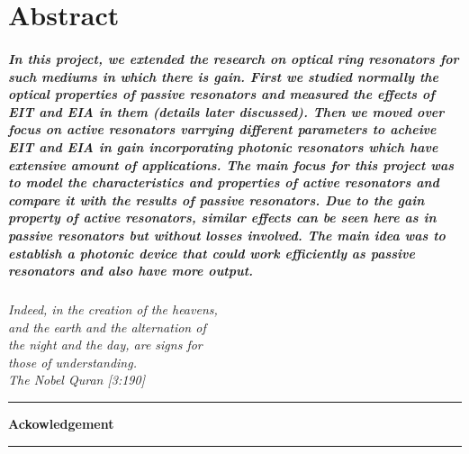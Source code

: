 \documentclass[12pt]{report}
\begin{document}
\chapter*{{\Large Abstract}}
\paragraph{ \normalfont In this project, we extended the research on optical ring resonators for such mediums in which there is gain. First we studied normally the optical properties of passive resonators and measured the effects of EIT and EIA in them (details later discussed). Then we moved over focus on active resonators varrying different parameters to acheive EIT and EIA in gain incorporating photonic resonators which have extensive amount of applications. The main focus for this project was to model the characteristics and properties of active resonators and compare it with the results of passive resonators. Due to the gain property of active resonators, similar effects can be seen here as in passive resonators but without losses involved. The main idea was to establish a photonic device that could work efficiently as passive resonators and also have more output.}

\newpage
{}
\begin{flushright}
\textit{\small{Indeed, in the creation of the heavens,\\ and the earth and the alternation of\\ the night and the day, are signs for\\ those of understanding.\\ The Nobel Quran [3:190]}}
\end{flushright}
\noindent\rule{15cm}{1pt}
\begin{flushleft}
\textbf{\Large{Ackowledgement}}
\end{flushleft}
\noindent\rule{15cm}{1pt} 
\end{document}
